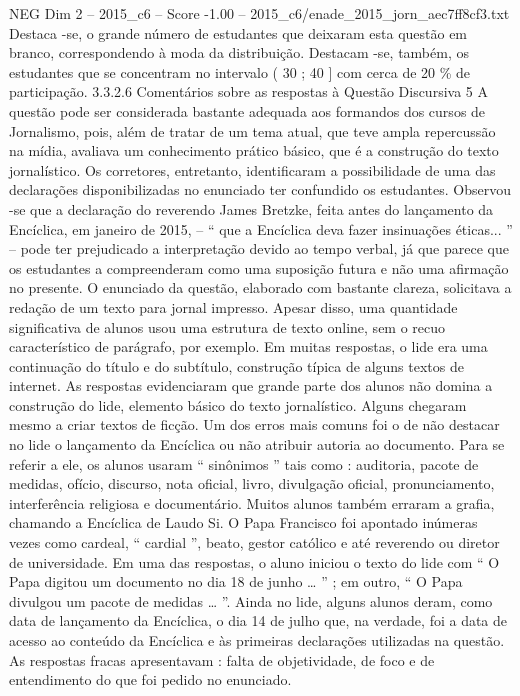 \begin{textsample}{NEG Dim 2 – 2015\_c6 – Score -1.00 – 2015\_c6/enade\_2015\_jorn\_aec7ff8cf3.txt}
Destaca -se, o grande número de estudantes que deixaram esta questão em branco, correspondendo à moda da distribuição.
Destacam -se, também, os estudantes que se concentram no intervalo ( 30 ; 40 ] com cerca de 20 \% de participação. 3.3.2.6 Comentários sobre as respostas à Questão Discursiva 5 A questão pode ser considerada bastante adequada aos formandos dos cursos de Jornalismo, pois, além de tratar de um tema atual, que teve ampla repercussão na mídia, avaliava um conhecimento prático básico, que é a construção do texto jornalístico.
Os corretores, entretanto, identificaram a possibilidade de uma das declarações disponibilizadas no enunciado ter confundido os estudantes.
Observou -se que a declaração do reverendo James Bretzke, feita antes do lançamento da Encíclica, em janeiro de 2015, – “ que a Encíclica deva fazer insinuações éticas... ” – pode ter prejudicado a interpretação devido ao tempo verbal, já que parece que os estudantes a compreenderam como uma suposição futura e não uma afirmação no presente.
O enunciado da questão, elaborado com bastante clareza, solicitava a redação de um texto para jornal impresso.
Apesar disso, uma quantidade significativa de alunos usou uma estrutura de texto online, sem o recuo característico de parágrafo, por exemplo.
Em muitas respostas, o lide era uma continuação do título e do subtítulo, construção típica de alguns textos de internet.
As respostas evidenciaram que grande parte dos alunos não domina a construção do lide, elemento básico do texto jornalístico.
Alguns chegaram mesmo a criar textos de ficção.
Um dos erros mais comuns foi o de não destacar no lide o lançamento da Encíclica ou não atribuir autoria ao documento.
Para se referir a ele, os alunos usaram “ sinônimos ” tais como : auditoria, pacote de medidas, ofício, discurso, nota oficial, livro, divulgação oficial, pronunciamento, interferência religiosa e documentário.
Muitos alunos também erraram a grafia, chamando a Encíclica de Laudo Si.
O Papa Francisco foi apontado inúmeras vezes como cardeal, “ cardial ”, beato, gestor católico e até reverendo ou diretor de universidade.
Em uma das respostas, o aluno iniciou o texto do lide com “ O Papa digitou um documento no dia 18 de junho … ” ; em outro, “ O Papa divulgou um pacote de medidas … ”.
Ainda no lide, alguns alunos deram, como data de lançamento da Encíclica, o dia 14 de julho que, na verdade, foi a data de acesso ao conteúdo da Encíclica e às primeiras declarações utilizadas na questão.
As respostas fracas apresentavam : falta de objetividade, de foco e de entendimento do que foi pedido no enunciado.

\end{textsample}

